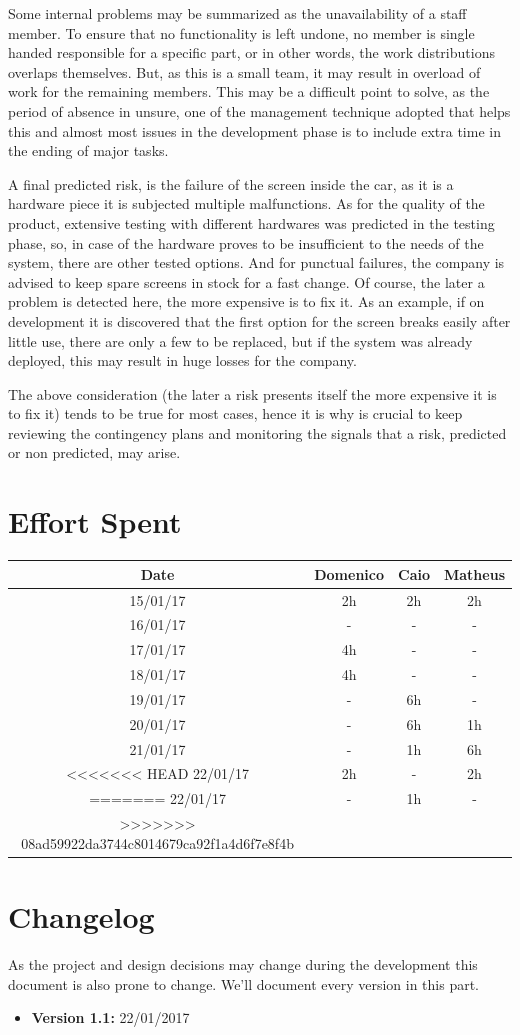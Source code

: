\documentclass[a4paper]{article}
\begin{document}
Some internal problems may be summarized as the unavailability of a staff member. To ensure that no functionality is left undone, no member is single handed responsible for a specific part, or in other words, the work distributions overlaps themselves.  But, as this is a small team, it may result in overload of work for the remaining members. This may be a difficult point to solve, as the period of absence in unsure, one of the management technique adopted that helps this and almost most issues in the development phase is to include extra time in the ending of major tasks.      

A final predicted risk, is the failure of the screen inside the car, as it is a hardware piece it is subjected multiple malfunctions. As for the quality of the product, extensive testing with different hardwares was predicted in the testing phase, so, in case of the hardware proves to be insufficient to the needs of the system, there are other tested options. And for punctual failures, the company is advised to keep spare screens in stock for a fast change. Of course, the later a problem is detected here, the more expensive is to fix it. As an example, if on development it is discovered that the first option for the screen breaks easily after little use, there are only a few to be replaced, but if the system was already deployed, this may result in huge losses for the company. 

The above consideration (the later a risk presents itself the more expensive it is to fix it) tends to be true for most cases, hence it is why is crucial to keep reviewing the contingency plans and monitoring the signals that a risk, predicted or non predicted, may arise. 


\newpage
\section{Effort Spent}
\begin{tabular}{ | c | c | c | c | }
\hline
	\textbf {Date} & \textbf {Domenico} & \textbf {Caio} & \textbf {Matheus} \\ \hline
	15/01/17& 2h & 2h & 2h  \\ \hline
	16/01/17& - & - & - \\ \hline
	17/01/17& 4h & - & - \\ \hline
	18/01/17& 4h & - & - \\ \hline
	19/01/17& - & 6h & - \\ \hline
	20/01/17& - & 6h & 1h \\ \hline
	21/01/17& - & 1h & 6h \\ \hline
<<<<<<< HEAD
	22/01/17& 2h & - & 2h \\ \hline
=======
	22/01/17& - & 1h & - \\ \hline
>>>>>>> 08ad59922da3744c8014679ca92f1a4d6f7e8f4b
\end{tabular}
\newpage

\section{Changelog}
As the project and design decisions may change during the development this document is also prone to change.
We'll document every version in this part.
\begin{itemize}
\item \textbf {Version 1.1:} 22/01/2017
\end{itemize}
\end{document}
